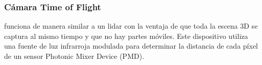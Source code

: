 \begin{frame}
    \frametitle{Cámara Time of Flight}
    
    funciona de manera similar a un lidar con la ventaja de que toda la escena 3D se captura al mismo tiempo y que no hay partes móviles. Este dispositivo utiliza una fuente de luz infrarroja modulada para determinar la distancia de cada píxel de un sensor Photonic Mixer Device (PMD).
\end{frame}